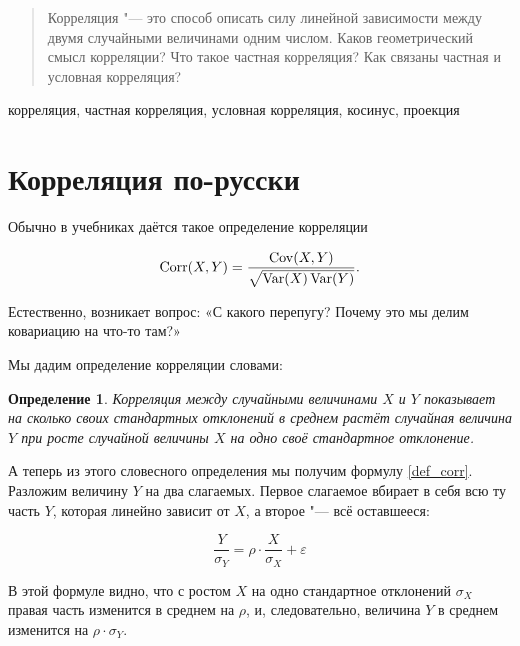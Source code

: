 \documentclass[10pt]{article}
\begin{document}


\DoFirstPageTechnicalStuff


\newtheorem{theorem}{Теорема}
\newtheorem{definition}{Определение}


\begin{abstract}
Корреляция "--- это способ описать силу линейной зависимости между двумя случайными величинами одним числом. Каков геометрический смысл корреляции? Что такое частная корреляция? Как связаны частная и условная корреляция? 
\end{abstract}

\begin{keyword}
корреляция, частная корреляция, условная корреляция, косинус, проекция
\end{keyword}



\section{Корреляция по-русски}

Обычно в учебниках даётся такое определение корреляции

\begin{equation}
\label{def_corr}
\operatorname{Corr}(X,Y)=\frac{\operatorname{Cov}(X,Y)}{\sqrt{\operatorname{Var}(X)\operatorname{Var}(Y)}}.
\end{equation}

Естественно, возникает вопрос: «С какого перепугу? Почему это мы делим ковариацию на что-то там?»

Мы дадим определение корреляции словами:

\begin{definition}
Корреляция между случайными величинами $X$ и $Y$ показывает на сколько своих стандартных отклонений в среднем растёт случайная величина $Y$ при росте случайной величины $X$ на одно своё стандартное отклонение.
\end{definition}

А теперь из этого словесного определения мы получим формулу \ref{def_corr}. Разложим величину $Y$ на два слагаемых. Первое слагаемое вбирает в себя всю ту часть $Y$, которая линейно зависит от $X$, а второе "--- всё оставшееся:

\[
\frac{Y}{\sigma_Y}=\rho \cdot \frac{X}{\sigma_X} + \varepsilon
\]

В этой формуле видно, что с ростом $X$ на одно стандартное отклонений $\sigma_X$ правая часть изменится в среднем на $\rho$, и, следовательно, величина $Y$ в среднем изменится на $\rho \cdot \sigma_Y$. 
\end{document}
